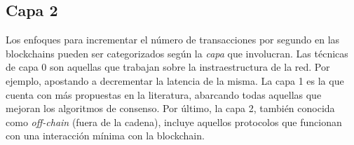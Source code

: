 



\subsection{Capa 2}
Los enfoques para incrementar el número de transacciones por segundo en las blockchains pueden
ser categorizados según la \emph{capa} que involucran.
%
Las técnicas de capa 0 son aquellas que trabajan sobre la instraestructura de la red.
%
Por ejemplo, apostando a decrementar la latencia de la misma.
% 
La capa 1 es la que cuenta con más propuestas en la literatura, abarcando todas aquellas que
mejoran los algoritmos de consenso.
%
Por último, la capa 2, también conocida como \emph{off-chain} (fuera de la cadena),
incluye aquellos protocolos que funcionan con una interacción mínima con la
blockchain.


